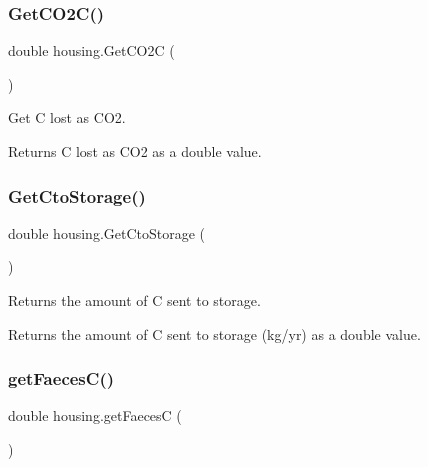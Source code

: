 \subsubsection{\texorpdfstring{GetCO2C()}{GetCO2C()}}
{\footnotesize\ttfamily double housing.\+Get\+C\+O2C (\begin{DoxyParamCaption}{ }\end{DoxyParamCaption})\hspace{0.3cm}{\ttfamily [inline]}}



Get C lost as C\+O2. 

\begin{DoxyReturn}{Returns}
C lost as C\+O2 as a double value. 
\end{DoxyReturn}
\mbox{\label{classhousing_ad26e09572df342d9e0b17400f24720ef}} 
\subsubsection{\texorpdfstring{GetCtoStorage()}{GetCtoStorage()}}
{\footnotesize\ttfamily double housing.\+Get\+Cto\+Storage (\begin{DoxyParamCaption}{ }\end{DoxyParamCaption})\hspace{0.3cm}{\ttfamily [inline]}}



Returns the amount of C sent to storage. 

\begin{DoxyReturn}{Returns}
the amount of C sent to storage (kg/yr) as a double value. 
\end{DoxyReturn}
\mbox{\label{classhousing_ac3deab93a70d3d7c05439aee7f1bcc2e}} 
\subsubsection{\texorpdfstring{getFaecesC()}{getFaecesC()}}
{\footnotesize\ttfamily double housing.\+get\+FaecesC (\begin{DoxyParamCaption}{ }\end{DoxyParamCaption})\hspace{0.3cm}{\ttfamily [inline]}}



